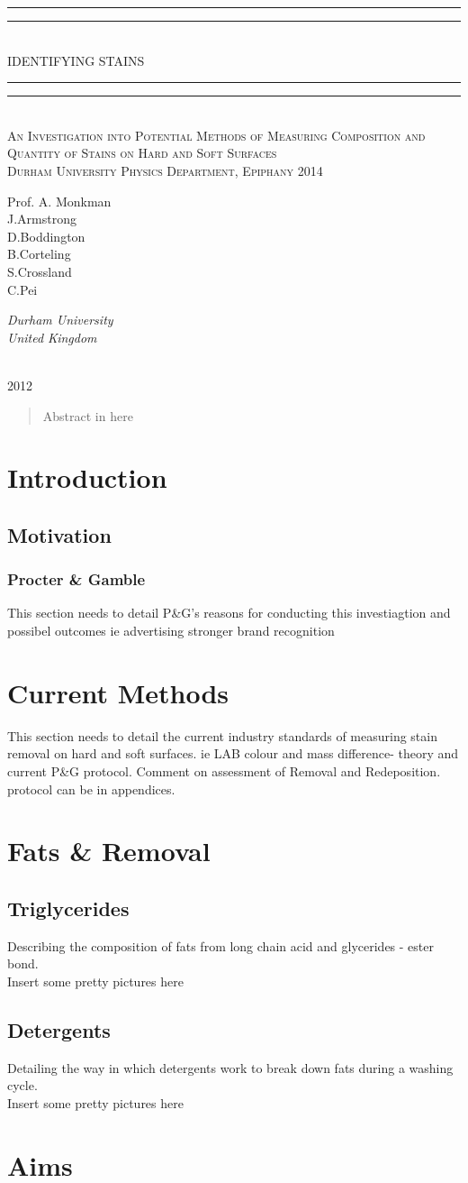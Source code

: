 \documentclass[a4paper ,12pt]{article}
\newcommand*{\plogo}{\fbox{$\mathcal{DU}$}}
\newcommand*{\titleGP}{\begingroup
\centering 
\vspace*{\baselineskip} 
\rule{\textwidth}{1.6pt}\vspace*{-\baselineskip}\vspace*{2pt} 
\rule{\textwidth}{0.4pt}\\[\baselineskip] 
{\LARGE IDENTIFYING STAINS}\\[0.2\baselineskip] 
\rule{\textwidth}{0.4pt}\vspace*{-\baselineskip}\vspace{3.2pt} 
\rule{\textwidth}{1.6pt}\\[\baselineskip] 
\scshape %
An Investigation into Potential Methods of Measuring Composition and Quantity of Stains on Hard and Soft Surfaces \\ 
[\baselineskip]Durham University Physics Department, Epiphany 2014\par 
\vspace*{2\baselineskip} 
{\Large Prof. A. Monkman \\ J.Armstrong \\ D.Boddington \\ B.Corteling \\ S.Crossland \\ C.Pei\par}
{\itshape Durham University\\ United Kingdom\par} 
\vfill 
\plogo \\[0.3\baselineskip] 
{\scshape\LARGE 2012} \\[0.3\baselineskip] 
\endgroup}
\begin{document}
\pagestyle{empty}
\titleGP

\newpage
\begin{abstract}
Abstract in here
\end{abstract}

\section{Introduction}

\subsection{Motivation}

\subsubsection{Procter \& Gamble}
This section needs to detail P\&G's reasons for conducting this investiagtion and possibel outcomes ie advertising stronger brand recognition

\section{Current Methods}

This section needs to detail the current industry standards of measuring stain removal on hard and soft surfaces. ie LAB colour and mass difference- theory and current P\&G protocol. Comment on assessment of Removal and Redeposition. protocol can be in appendices.

\section{Fats \& Removal}
\subsection{Triglycerides}
Describing the composition of fats from long chain acid and glycerides - ester bond.\\Insert some pretty pictures here
\subsection{Detergents}
Detailing the way in which detergents work to break down fats during a washing cycle.\\Insert some pretty pictures here

\section{Aims}
\end{document}
